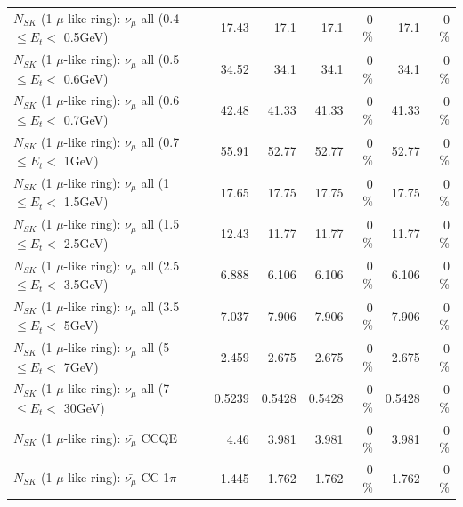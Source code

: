 \begin{table}
\begin{tabular}{| l | r | r | r  r | r  r |}
       $N_{SK}$ (1 $\mu$-like ring): $\nu_{\mu}$ all (0.4 $\leq E_{t} <$ 0.5GeV) &           17.43 &            17.1 &            17.1 &        0 \%  &            17.1 &        0 \%  \\ 
       $N_{SK}$ (1 $\mu$-like ring): $\nu_{\mu}$ all (0.5 $\leq E_{t} <$ 0.6GeV) &           34.52 &            34.1 &            34.1 &        0 \%  &            34.1 &        0 \%  \\ 
       $N_{SK}$ (1 $\mu$-like ring): $\nu_{\mu}$ all (0.6 $\leq E_{t} <$ 0.7GeV) &           42.48 &           41.33 &           41.33 &        0 \%  &           41.33 &        0 \%  \\ 
         $N_{SK}$ (1 $\mu$-like ring): $\nu_{\mu}$ all (0.7 $\leq E_{t} <$ 1GeV) &           55.91 &           52.77 &           52.77 &        0 \%  &           52.77 &        0 \%  \\ 
         $N_{SK}$ (1 $\mu$-like ring): $\nu_{\mu}$ all (1 $\leq E_{t} <$ 1.5GeV) &           17.65 &           17.75 &           17.75 &        0 \%  &           17.75 &        0 \%  \\ 
       $N_{SK}$ (1 $\mu$-like ring): $\nu_{\mu}$ all (1.5 $\leq E_{t} <$ 2.5GeV) &           12.43 &           11.77 &           11.77 &        0 \%  &           11.77 &        0 \%  \\ 
       $N_{SK}$ (1 $\mu$-like ring): $\nu_{\mu}$ all (2.5 $\leq E_{t} <$ 3.5GeV) &           6.888 &           6.106 &           6.106 &        0 \%  &           6.106 &        0 \%  \\ 
         $N_{SK}$ (1 $\mu$-like ring): $\nu_{\mu}$ all (3.5 $\leq E_{t} <$ 5GeV) &           7.037 &           7.906 &           7.906 &        0 \%  &           7.906 &        0 \%  \\ 
           $N_{SK}$ (1 $\mu$-like ring): $\nu_{\mu}$ all (5 $\leq E_{t} <$ 7GeV) &           2.459 &           2.675 &           2.675 &        0 \%  &           2.675 &        0 \%  \\ 
          $N_{SK}$ (1 $\mu$-like ring): $\nu_{\mu}$ all (7 $\leq E_{t} <$ 30GeV) &          0.5239 &          0.5428 &          0.5428 &        0 \%  &          0.5428 &        0 \%  \\ 
\hline
\hline
\hline
                              $N_{SK}$ (1 $\mu$-like ring): $\bar{\nu_\mu}$ CCQE &            4.46 &           3.981 &           3.981 &        0 \%  &           3.981 &        0 \%  \\ 
                         $N_{SK}$ (1 $\mu$-like ring): $\bar{\nu_\mu}$ CC 1$\pi$ &           1.445 &           1.762 &           1.762 &        0 \%  &           1.762 &        0 \%  \\ 

\end{tabular}
\end{table}
